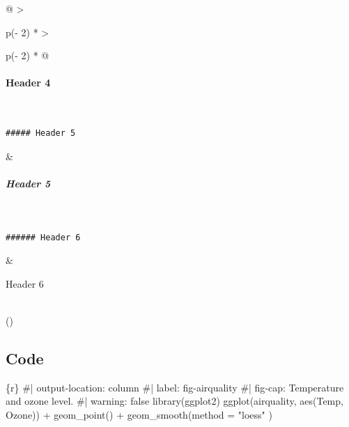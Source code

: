 \documentclass[
  letterpaper,
  DIV=11,
  numbers=noendperiod]{scrartcl}
\let\oldparagraph\paragraph
\renewcommand{\paragraph}[1]{\oldparagraph{#1}\mbox{}}
\let\oldsubparagraph\subparagraph
\renewcommand{\subparagraph}[1]{\oldsubparagraph{#1}\mbox{}}
\newenvironment{Shaded}{\begin{snugshade}}{\end{snugshade}}
\newcommand{\AttributeTok}[1]{\textcolor[rgb]{0.40,0.45,0.13}{#1}}
\newcommand{\CommentTok}[1]{\textcolor[rgb]{0.37,0.37,0.37}{#1}}
\newcommand{\FunctionTok}[1]{\textcolor[rgb]{0.28,0.35,0.67}{#1}}
\newcommand{\InformationTok}[1]{\textcolor[rgb]{0.37,0.37,0.37}{#1}}
\newcommand{\NormalTok}[1]{\textcolor[rgb]{0.00,0.23,0.31}{#1}}
\newcommand{\SpecialCharTok}[1]{\textcolor[rgb]{0.37,0.37,0.37}{#1}}
\newcommand{\StringTok}[1]{\textcolor[rgb]{0.13,0.47,0.30}{#1}}
\begin{document}
\begin{longtable}[]{@{}
  >{\raggedright\arraybackslash}p{(\columnwidth - 2\tabcolsep) * }
  >{\raggedright\arraybackslash}p{(\columnwidth - 2\tabcolsep) * }@{}}
\begin{minipage}[t]{\linewidth}
{\paragraph{Header 4}\label{header-4}}
\end{minipage} \\
\begin{minipage}[t]{\linewidth}\raggedright
\begin{verbatim}
##### Header 5
\end{verbatim}
\end{minipage} & \begin{minipage}[t]{\linewidth}\raggedright
\hypertarget{header-5}{%
\subparagraph{Header 5}\label{header-5}}
\end{minipage} \\
\begin{minipage}[t]{\linewidth}\raggedright
\begin{verbatim}
###### Header 6
\end{verbatim}
\end{minipage} & \begin{minipage}[t]{\linewidth}\raggedright
Header 6
\end{minipage} \\
\bottomrule()
\end{longtable}

\hypertarget{code}{%
\subsection{Code}\label{code}}

\begin{Shaded}
\begin{Highlighting}[]
\InformationTok{\textasciigrave{}\textasciigrave{}\textasciigrave{}\{r\}}
\CommentTok{\#| output{-}location: column}
\CommentTok{\#| label: fig{-}airquality}
\CommentTok{\#| fig{-}cap: Temperature and ozone level.}
\CommentTok{\#| warning: false}
\FunctionTok{library}\NormalTok{(ggplot2)}
\FunctionTok{ggplot}\NormalTok{(airquality, }\FunctionTok{aes}\NormalTok{(Temp, Ozone)) }\SpecialCharTok{+} 
  \FunctionTok{geom\_point}\NormalTok{() }\SpecialCharTok{+} 
  \FunctionTok{geom\_smooth}\NormalTok{(}\AttributeTok{method =} \StringTok{"loess"}
\NormalTok{)}
\InformationTok{\textasciigrave{}\textasciigrave{}\textasciigrave{}}
\end{Highlighting}
\end{Shaded}
\end{document}
